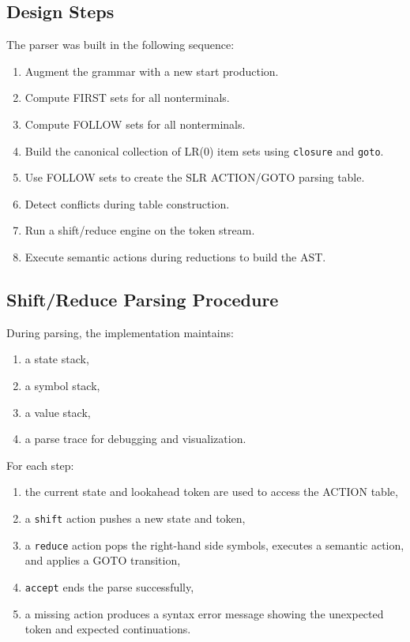 \documentclass[12pt,a4paper]{article}
\begin{document}
\subsection{Design Steps}
The parser was built in the following sequence:

\begin{enumerate}
    \item Augment the grammar with a new start production.
    \item Compute FIRST sets for all nonterminals.
    \item Compute FOLLOW sets for all nonterminals.
    \item Build the canonical collection of LR(0) item sets using \texttt{closure} and \texttt{goto}.
    \item Use FOLLOW sets to create the SLR ACTION/GOTO parsing table.
    \item Detect conflicts during table construction.
    \item Run a shift/reduce engine on the token stream.
    \item Execute semantic actions during reductions to build the AST.
\end{enumerate}

\subsection{Shift/Reduce Parsing Procedure}
During parsing, the implementation maintains:

\begin{enumerate}
    \item a state stack,
    \item a symbol stack,
    \item a value stack,
    \item a parse trace for debugging and visualization.
\end{enumerate}

For each step:

\begin{enumerate}
    \item the current state and lookahead token are used to access the ACTION table,
    \item a \texttt{shift} action pushes a new state and token,
    \item a \texttt{reduce} action pops the right-hand side symbols, executes a semantic action, and applies a GOTO transition,
    \item \texttt{accept} ends the parse successfully,
    \item a missing action produces a syntax error message showing the unexpected token and expected continuations.
\end{enumerate}
\end{document}
